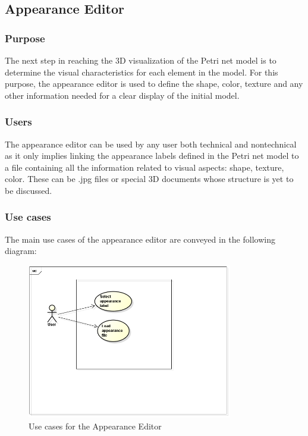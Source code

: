 \subsection{Appearance Editor}
\subsubsection{Purpose}
The next step in reaching the 3D visualization of the Petri net model is to determine the visual characteristics for each element in the model. For this purpose, the appearance editor is used to define the shape, color, texture and any other information needed for a clear display of the initial model. 
\subsubsection{Users}
	The appearance editor can be used by any user both technical and nontechnical as it only implies linking the appearance labels defined in the Petri net model to a file containing all the information related to visual aspects: shape, texture, color. These can be .jpg files or special 3D documents whose structure is yet to be discussed.

\subsubsection{Use cases}
	The main use cases of the appearance editor are conveyed in the following diagram: 
	
	\begin{figure}[htp]
\begin{center}
  \includegraphics[width=0.8\textwidth]{image/AppearanceUC.png}
  \caption{Use cases for the Appearance Editor}
  \label{fig:appearance_editor_usecases}
\end{center}
\end{figure}



